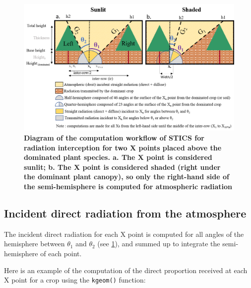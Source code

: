 \documentclass[]{book}
\begin{document}
\begin{figure}
\centering
\includegraphics{img/Light-interception-dominated.png}
\caption{\label{fig:Compdominated}\textbf{Diagram of the computation workflow of STICS for radiation interception for two X points placed above the dominated plant species. a. The X point is considered sunlit; b. The X point is considered shaded (right under the dominant plant canopy), so only the right-hand side of the semi-hemisphere is computed for atmospheric radiation}}
\end{figure}

\hypertarget{incident-direct-radiation-from-the-atmosphere}{%
\subsection{Incident direct radiation from the atmosphere}\label{incident-direct-radiation-from-the-atmosphere}}

The incident direct radiation for each X point is computed for all angles of the hemisphere between \(\theta_1\) and \(\theta_2\) (see \ref{fig:Compdominated}), and summed up to integrate the semi-hemisphere of each point.

Here is an example of the computation of the direct proportion received at each X point for a crop using the \texttt{kgeom()} function:
\end{document}
